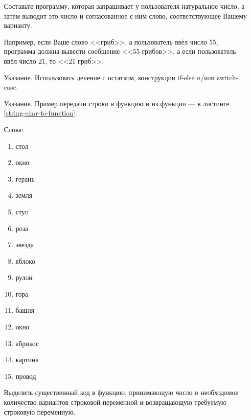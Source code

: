 
\labtask

Составьте программу, которая запрашивает у пользователя натуральное число, а затем выводит это число и согласованное с ним слово, соответствующее Вашему варианту.

Например, если Ваше слово <<гриб>>, а пользователь ввёл число 55, программа должна вывести сообщение <<55 грибов>>, а если пользователь ввёл число 21, то <<21 гриб>>.

Указание. Использовать деление с остатком, конструкции if-else и/или switch-case.

Указание. Пример передачи строки в функцию и из функции --- в листинге \ref{string-char-to-function}.

Слова:

\begin{enumerate}

\item стол

\item окно

\item  герань

\item  земля

\item  стул

\item  роза 

\item  звезда

\item  яблоко

\item  рулон

\item  гора

\item  башня

\item  окно

\item  абрикос

\item  картина

\item  провод



\end{enumerate}


\labtask

Выделить существенный код в функцию, принимающую число и необходимое количество вариантов строковой переменной и возвращающую требуемую строковую переменную.

